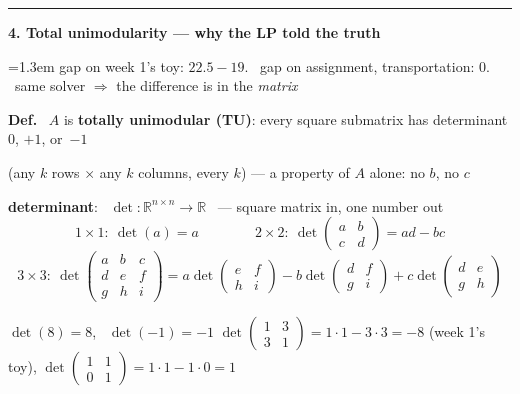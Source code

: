 \documentclass[10pt]{article}
\newcommand{\beat}[2]{%
  \par\medskip\needspace{8\baselineskip}%
  {\color{ruleink}\rule{\textwidth}{1pt}}\par\nobreak\vspace{2pt}
  {\large\bfseries #1.\; #2}\par\nobreak\vspace{3pt}}
\newenvironment{board}{%
  \par\vspace{2pt}
  \begingroup\leftskip=1.3em\relax}{%
  \par\endgroup\vspace{2pt}}
\begin{document}
\beat{4}{Total unimodularity --- why the LP told the truth}
\begin{board}
gap on week 1's toy: $22.5 - 19$. \ gap on assignment, transportation: $0$. \ same solver $\Rightarrow$ the difference is in the \emph{matrix}%
\vspace{3pt}

\textbf{Def.} \ $A$ is \textbf{totally unimodular (TU)}: every square submatrix has
determinant $0$, $+1$, or~$-1$
\vspace{1pt}

\quad (any $k$ rows $\times$ any $k$ columns, every $k$) \quad --- a property of $A$ alone: no $b$, no $c$
\vspace{3pt}

\textbf{determinant}: \ $\det : \mathbb{R}^{n \times n} \to \mathbb{R}$ \ --- square matrix in, one number out
\[
  1 \times 1: \ \det(a) = a
  \qquad\qquad
  2 \times 2: \ \det\begin{pmatrix} a & b \\ c & d \end{pmatrix} = ad - bc
\]
\[
  3 \times 3: \ \det\begin{pmatrix} a & b & c \\ d & e & f \\ g & h & i \end{pmatrix}
  = a \det\begin{pmatrix} e & f \\ h & i \end{pmatrix}
  - b \det\begin{pmatrix} d & f \\ g & i \end{pmatrix}
  + c \det\begin{pmatrix} d & e \\ g & h \end{pmatrix}
\]

\quad $\det(8) = 8$, \ $\det(-1) = -1$ \qquad
$\det\left(\begin{smallmatrix} 1 & 3 \\ 3 & 1 \end{smallmatrix}\right) = 1 \cdot 1 - 3 \cdot 3 = -8$ (week 1's toy), \quad
$\det\left(\begin{smallmatrix} 1 & 1 \\ 0 & 1 \end{smallmatrix}\right) = 1 \cdot 1 - 1 \cdot 0 = 1$
\vspace{1pt}


\end{board}
\end{document}
